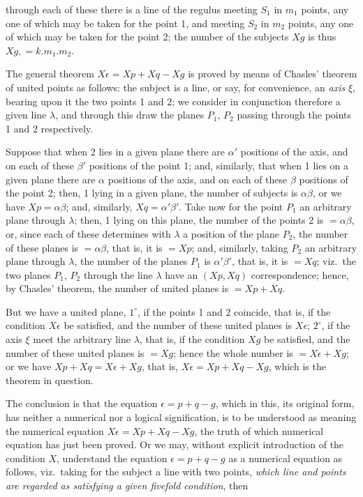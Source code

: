\documentclass[11pt,a4paper]{book}
\begin{document}
\newpage
\noindent through each of these there is a line of the regulus meeting $S_1$ in $m_1$ points, any one of which may be taken for the point 1, and meeting $S_2$ in $m_2$ points, any one of which may be taken for the point 2; the number of the subjects $Xg$ is thus $Xg, = k.m_1.m_2$.

The general theorem $X\epsilon = Xp + Xq - Xg$ is proved by means of Chasles' theorem of united points as follows: the subject is a line, or say, for convenience, an \textit{axis} $\xi$, bearing upon it the two points 1 and 2; we consider in conjunction therefore a given line $\lambda$, and through this draw the planes $P_1$, $P_2$ passing through the points 1 and 2 respectively.

Suppose that when 2 lies in a given plane there are $\alpha'$ positions of the axis, and on each of these $\beta'$ positions of the point 1; and, similarly, that when 1 lies on a given plane there are $\alpha$ positions of the axis, and on each of these $\beta$ positions of the point 2; then, 1 lying in a given plane, the number of subjects is $\alpha\beta$, or we have $Xp = \alpha\beta$; and, similarly, $Xq = \alpha'\beta'$. Take now for the point $P_1$ an arbitrary plane through $\lambda$; then, 1 lying on this plane, the number of the points 2 is $= \alpha\beta$, or, since each of these determines with $\lambda$ a position of the plane $P_2$, the number of these planes is $= \alpha\beta$, that is, it is $= Xp$; and, similarly, taking $P_2$ an arbitrary plane through $\lambda$, the number of the planes $P_1$ is $\alpha'\beta'$, that is, it is $= Xq$; viz.\ the two planes $P_1$, $P_2$ through the line $\lambda$ have an $(Xp, Xq)$ correspondence; hence, by Chasles' theorem, the number of united planes is $= Xp + Xq$.

But we have a united plane, $1^{\circ}$, if the points 1 and 2 coincide, that is, if the condition $X\epsilon$ be satisfied, and the number of these united planes is $X\epsilon$; $2^{\circ}$, if the axis $\xi$ meet the arbitrary line $\lambda$, that is, if the condition $Xg$ be satisfied, and the number of these united planes is $= Xg$; hence the whole number is $= X\epsilon + Xg$; or we have $Xp + Xq = X\epsilon + Xg$, that is, $X\epsilon = Xp + Xq - Xg$, which is the theorem in question.

The conclusion is that the equation $\epsilon = p + q - g$, which in this, its original form, has neither a numerical nor a logical signification, is to be understood as meaning the numerical equation $X\epsilon = Xp + Xq - Xg$, the truth of which numerical equation has just been proved. Or we may, without explicit introduction of the condition $X$, understand the equation $\epsilon = p + q - g$ as a numerical equation as follows, viz.\ taking for the subject a line with two points, \textit{which line and points are regarded as satisfying a given fivefold condition}, then
\end{document}
